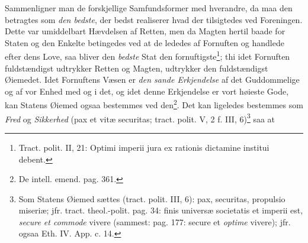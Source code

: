 \documentclass[12pt,a4paper]{book}
\newcommand{\opage}[1]{\marginnote{\footnotesize\textit{[#1]}}}
\begin{document}
Sammenligner man de forskjellige Samfundsformer med hverandre, da maa den betragtes som \emph{den bedste}, der bedst realiserer hvad der tilsigtedes ved Foreningen. Dette var umiddelbart Hævdelsen af Retten, men da Magten hertil baade for Staten og den Enkelte betingedes ved at de lededes af Fornuften og handlede efter dens Love, saa bliver den \emph{bedste} Stat den fornuftigste\footnote{Tract. polit. II, 21: Optimi imperii jura ex rationis dictamine institui debent.}; thi idet Fornuften fuldstændigst udtrykker Retten og Magten, udtrykker den fuldstændigst Øiemedet. Idet Fornuftens Væsen er \emph{den sande Erkjendelse} af det Guddommelige og af vor Enhed med og i det, og idet denne Erkjendelse er vort høieste Gode, kan Statens Øiemed ogsaa bestemmes ved den\footnote{De intell. emend. pag. 361.}. Det kan ligeledes bestemmes som \emph{Fred} og \emph{Sikkerhed} (pax et vitæ securitas; tract. polit. V, 2 f. III, 6)\footnote{Som Statens Øiemed sættes (tract. polit. III, 6): pax, securitas, propulsio miseriæ; jfr. tract. theol.-polit. pag. 34: finis universæ societatis et imperii est, \emph{secure et commode} vivere (sammest: pag. 177: secure et \emph{optime} vivere); jfr. ogsaa Eth. IV. App. c. 14.} saa at
\opage{143} \setcounter{footnote}{0}%
\end{document}
